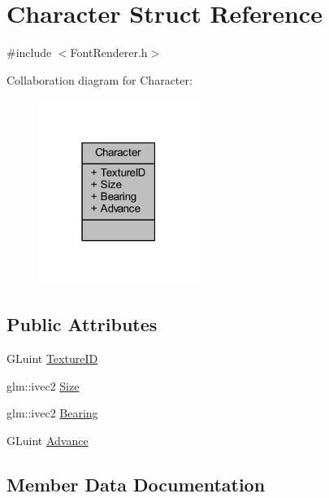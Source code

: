 \hypertarget{struct_character}{}\section{Character Struct Reference}
\label{struct_character}


{\ttfamily \#include $<$Font\+Renderer.\+h$>$}



Collaboration diagram for Character\+:
\nopagebreak
\begin{figure}[H]
\begin{center}
\leavevmode
\includegraphics[width=147pt]{struct_character__coll__graph}
\end{center}
\end{figure}
\subsection*{Public Attributes}
\begin{DoxyCompactItemize}
\item 
G\+Luint \mbox{\hyperlink{struct_character_a51d894cc31d79e95fe1a47fb65c6e889}{Texture\+ID}}
\item 
glm\+::ivec2 \mbox{\hyperlink{struct_character_aaaa598050e0ef590fe6903fd2bab40b8}{Size}}
\item 
glm\+::ivec2 \mbox{\hyperlink{struct_character_afef98bf9c7f5313d96476f6f3f85f872}{Bearing}}
\item 
G\+Luint \mbox{\hyperlink{struct_character_ab35bae8be6740729fc5839c237a659f6}{Advance}}
\end{DoxyCompactItemize}


\subsection{Member Data Documentation}
\mbox{\label{struct_character_ab35bae8be6740729fc5839c237a659f6}} 

